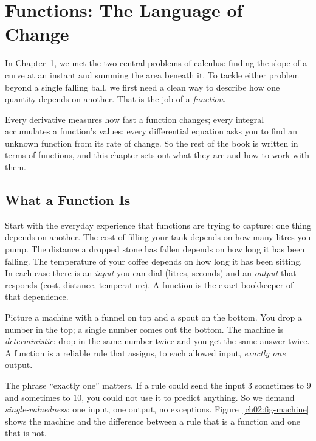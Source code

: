 \chapter{Functions: The Language of Change}

In Chapter~1, we met the two central problems of calculus: finding the slope of a curve at an instant and summing the area beneath it.
To tackle either problem beyond a single falling ball, we first need a clean way to describe how one quantity depends on another. That is the job of a \emph{function}.

Every derivative measures how fast a function changes; every integral accumulates a function's values;
every differential equation asks you to find an unknown function from its rate of change. So the rest of the book is written in terms of functions, and this chapter sets out what they are and how to work with them.

\section{What a Function Is}
\label{ch02:what-is-a-function}

Start with the everyday experience that functions are trying to capture: one
thing depends on another. The cost of filling your tank depends on how many
litres you pump. The distance a dropped stone has fallen depends on how long it
has been falling. The temperature of your coffee depends on how long it has been
sitting. In each case there is an \emph{input} you can dial (litres, seconds) and
an \emph{output} that responds (cost, distance, temperature). A function is the
exact bookkeeper of that dependence.

\begin{intuitionbox}
Picture a machine with a funnel on top and a spout on the bottom. You drop a
number in the top; a single number comes out the bottom. The machine is
\emph{deterministic}: drop in the same number twice and you get the same answer
twice. A function is a reliable rule that assigns, to each
allowed input, \emph{exactly one} output.
\end{intuitionbox}

The phrase ``exactly one'' matters. If a rule could send the input $3$ sometimes
to $9$ and sometimes to $10$, you could not use it to predict anything. So we
demand \emph{single-valuedness}: one input, one output, no exceptions.
Figure~\ref{ch02:fig-machine} shows the machine and the difference between a rule
that is a function and one that is not.

